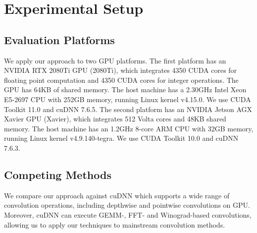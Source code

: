 

\section{Experimental Setup}

\subsection{Evaluation Platforms} We apply our approach to two GPU platforms.
The first platform has an NVIDIA RTX 2080Ti GPU (2080Ti), which integrates 4350 CUDA cores for floating point computation and 4350 CUDA
cores for integer operations. The GPU has 64KB of shared memory. The host machine has a 2.30GHz Intel Xeon E5-2697 CPU with 252GB memory,
running Linux kernel v4.15.0. We use CUDA Toolkit 11.0 and cuDNN 7.6.5. The second platform has an NVIDIA Jetson AGX Xavier GPU (Xavier),
which integrates 512 Volta cores and 48KB shared memory. The host machine has an 1.2GHz 8-core ARM CPU with 32GB memory, running Linux
kernel v4.9.140-tegra. We use CUDA Toolkit 10.0 and cuDNN 7.6.3.


\subsection{Competing Methods} We compare our approach against cuDNN \cite{ChetlurWVCTCS14} which supports a wide range of convolution operations,
 including depthwise and pointwise convolutions on GPU.  Moreover, cuDNN can execute GEMM-, FFT- and Winograd-based convolutions, allowing
 us to apply our techniques to mainstream convolution methods.


%
%


